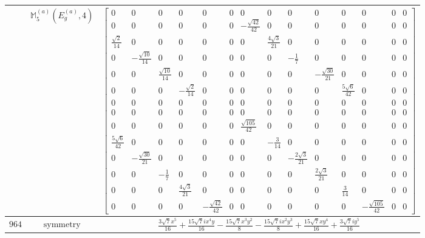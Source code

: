 \documentclass[fleqn,8pt,landscape]{jsarticle}
\begin{document}
\begin{longtable}{ccc}
$  $ & $ \mathbb{M}_{5}^{(a)}(E_{g}^{(a)},4) $ & $ \begin{bmatrix} 0 & 0 & 0 & 0 & 0 & 0 & 0 & 0 & 0 & 0 & 0 & 0 & 0 & 0 \\ 0 & 0 & 0 & 0 & 0 & 0 & - \frac{\sqrt{42}}{42} & 0 & 0 & 0 & 0 & 0 & 0 & 0 \\ \frac{\sqrt{2}}{14} & 0 & 0 & 0 & 0 & 0 & 0 & \frac{4 \sqrt{3}}{21} & 0 & 0 & 0 & 0 & 0 & 0 \\ 0 & - \frac{\sqrt{10}}{14} & 0 & 0 & 0 & 0 & 0 & 0 & - \frac{1}{7} & 0 & 0 & 0 & 0 & 0 \\ 0 & 0 & \frac{\sqrt{10}}{14} & 0 & 0 & 0 & 0 & 0 & 0 & - \frac{\sqrt{30}}{21} & 0 & 0 & 0 & 0 \\ 0 & 0 & 0 & - \frac{\sqrt{2}}{14} & 0 & 0 & 0 & 0 & 0 & 0 & \frac{5 \sqrt{6}}{42} & 0 & 0 & 0 \\ 0 & 0 & 0 & 0 & 0 & 0 & 0 & 0 & 0 & 0 & 0 & 0 & 0 & 0 \\ 0 & 0 & 0 & 0 & 0 & 0 & 0 & 0 & 0 & 0 & 0 & 0 & 0 & 0 \\ 0 & 0 & 0 & 0 & 0 & 0 & \frac{\sqrt{105}}{42} & 0 & 0 & 0 & 0 & 0 & 0 & 0 \\ \frac{5 \sqrt{6}}{42} & 0 & 0 & 0 & 0 & 0 & 0 & - \frac{3}{14} & 0 & 0 & 0 & 0 & 0 & 0 \\ 0 & - \frac{\sqrt{30}}{21} & 0 & 0 & 0 & 0 & 0 & 0 & - \frac{2 \sqrt{3}}{21} & 0 & 0 & 0 & 0 & 0 \\ 0 & 0 & - \frac{1}{7} & 0 & 0 & 0 & 0 & 0 & 0 & \frac{2 \sqrt{3}}{21} & 0 & 0 & 0 & 0 \\ 0 & 0 & 0 & \frac{4 \sqrt{3}}{21} & 0 & 0 & 0 & 0 & 0 & 0 & \frac{3}{14} & 0 & 0 & 0 \\ 0 & 0 & 0 & 0 & - \frac{\sqrt{42}}{42} & 0 & 0 & 0 & 0 & 0 & 0 & - \frac{\sqrt{105}}{42} & 0 & 0 \end{bmatrix} $ \\ \hline
$ 964 $ & $ \text{symmetry} $ & $ \frac{3 \sqrt{7} x^{5}}{16} + \frac{15 \sqrt{7} i x^{4} y}{16} - \frac{15 \sqrt{7} x^{3} y^{2}}{8} - \frac{15 \sqrt{7} i x^{2} y^{3}}{8} + \frac{15 \sqrt{7} x y^{4}}{16} + \frac{3 \sqrt{7} i y^{5}}{16} $ \\

\end{longtable}
\end{document}
